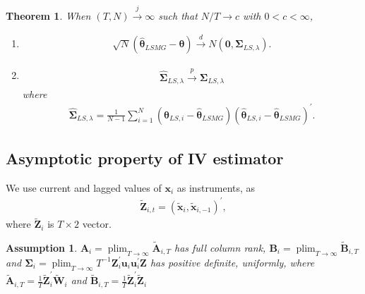 \documentclass[12pt,a4paper,hyperref]{article}
\newtheorem{myTheo}{Theorem}
\newtheorem{myAssu}{Assumption}
\DeclareMathOperator*{\plim}{plim}
\begin{document}
\begin{myTheo}
When $(T,N) \overset{j}{\to} \infty$ such that $N/T \to c$ with $0<c< \infty$,
\begin{enumerate}
\item \begin{align}
\sqrt{N}\left(\hat{\boldsymbol{\theta}}_{LSMG}-\boldsymbol{\theta}  \right)\overset{d}{\to} N\left(\boldsymbol{0},\boldsymbol{\Sigma}_{LS,\lambda} \right).
\end{align}
\item \begin{align}
\hat{\boldsymbol{\Sigma}}_{LS,\lambda} \overset{p}{\to}  \boldsymbol{\Sigma}_{LS,\lambda}
\end{align}
where
\begin{align}
 \hat{\boldsymbol{\Sigma}}_{LS,\lambda}=\frac{1}{N-1}\sum^{N}_{i=1}\left( \hat{\boldsymbol{\theta}}_{LS,i}- \hat{\boldsymbol{\theta}}_{LSMG}\right)\left( \hat{\boldsymbol{\theta}}_{LS,i}- \hat{\boldsymbol{\theta}}_{LSMG}\right)^{'}.
\end{align}
\end{enumerate}
\end{myTheo}



\subsection{Asymptotic property of IV estimator}
We use current and lagged values of $\boldsymbol{x}_{i}$ as instruments, as
\begin{align}
\tilde{\boldsymbol{Z}}_{i,t}=\left( \tilde{\boldsymbol{x}}_{i}, \tilde{\boldsymbol{x}}_{i,-1} \right)^{'},
\end{align}
where $\tilde{\boldsymbol{Z}}_{i}$ is $T \times  2$ vector. \\

\begin{myAssu}
$\boldsymbol{A}_{i}=\plim_{T \to \infty}\tilde{\boldsymbol{A}}_{i,T}$ has full column rank, $\boldsymbol{B}_{i}=\plim_{T \to \infty}\tilde{\boldsymbol{B}}_{i,T}$ and $\boldsymbol{\Sigma}_{i}=\plim_{T \to \infty} T^{-1}\boldsymbol{Z}^{'}_{i}\boldsymbol{u}_{i} \boldsymbol{u}_{i}^{'}\boldsymbol{Z}$ has positive definite, uniformly, where $\tilde{\boldsymbol{A}}_{i,T}= \frac{1}{T}\tilde{\boldsymbol{Z}}^{'}_{i}\tilde{\boldsymbol{W}}_{i}$ and $\tilde{\boldsymbol{B}}_{i,T}= \frac{1}{T}\tilde{\boldsymbol{Z}}^{'}_{i}\tilde{\boldsymbol{Z}}_{i}$ \\
\end{myAssu}
\end{document}
